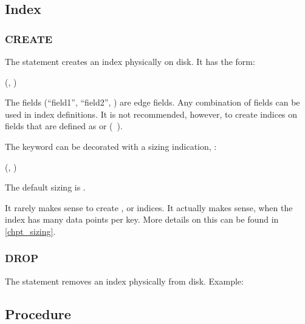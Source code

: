  

\subsection{Index}
\subsubsection{CREATE}
The  statement
creates an index physically on disk.
It has the form:

   
(, )

The fields (``field1'', ``field2'', \etc)
are edge fields. Any combination of fields
can be used in index definitions.
It is not recommended, however,
to create indices on fields that are defined as 
or  (\eg\ ).


The  keyword can be decorated with a sizing
indication, \eg:

   
(, )

The default sizing is .

It rarely makes sense to create 
, 
 or 
 indices.
It actually makes sense,
when the index
has many data points per key.
More details on this can be found in \ref{chpt_sizing}.


\subsubsection{DROP}
The  statement removes an index physically from disk.
Example:

 

\subsection{Procedure}
